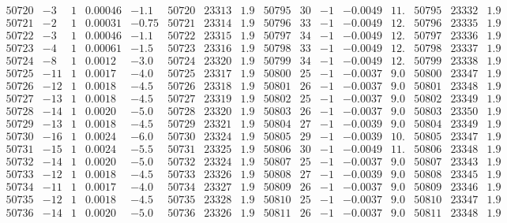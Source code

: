 \documentclass[11pt,reqno,a4letter]{article}
\numberwithin{figure}{section}
\numberwithin{table}{section}
\theoremstyle{plain}
\numberwithin{theorem}{section}
\theoremstyle{definition}
\begin{document}
\begin{table}[ht]
\begin{equation*}
{\begin{array}{ccccc|ccc||ccccc|ccc}
50720 & -3 & 1 & 0.00046 & -1.1 & 50720 & 23313 & 1.9 & 50795 & 30 & -1 & -0.0049 & 11. & 50795 & 23332 & 1.9  \\
50721 & -2 & 1 & 0.00031 & -0.75 & 50721 & 23314 & 1.9 & 50796 & 33 & -1 & -0.0049 & 12. & 50796 & 23335 & 1.9  \\
50722 & -3 & 1 & 0.00046 & -1.1 & 50722 & 23315 & 1.9 & 50797 & 34 & -1 & -0.0049 & 12. & 50797 & 23336 & 1.9  \\
50723 & -4 & 1 & 0.00061 & -1.5 & 50723 & 23316 & 1.9 & 50798 & 33 & -1 & -0.0049 & 12. & 50798 & 23337 & 1.9  \\
50724 & -8 & 1 & 0.0012 & -3.0 & 50724 & 23320 & 1.9 & 50799 & 34 & -1 & -0.0049 & 12. & 50799 & 23338 & 1.9  \\
50725 & -11 & 1 & 0.0017 & -4.0 & 50725 & 23317 & 1.9 & 50800 & 25 & -1 & -0.0037 & 9.0 & 50800 & 23347 & 1.9  \\
50726 & -12 & 1 & 0.0018 & -4.5 & 50726 & 23318 & 1.9 & 50801 & 26 & -1 & -0.0037 & 9.0 & 50801 & 23348 & 1.9  \\
50727 & -13 & 1 & 0.0018 & -4.5 & 50727 & 23319 & 1.9 & 50802 & 25 & -1 & -0.0037 & 9.0 & 50802 & 23349 & 1.9  \\
50728 & -14 & 1 & 0.0020 & -5.0 & 50728 & 23320 & 1.9 & 50803 & 26 & -1 & -0.0037 & 9.0 & 50803 & 23350 & 1.9  \\
50729 & -13 & 1 & 0.0018 & -4.5 & 50729 & 23321 & 1.9 & 50804 & 27 & -1 & -0.0039 & 9.0 & 50804 & 23349 & 1.9  \\
50730 & -16 & 1 & 0.0024 & -6.0 & 50730 & 23324 & 1.9 & 50805 & 29 & -1 & -0.0039 & 10. & 50805 & 23347 & 1.9  \\
50731 & -15 & 1 & 0.0024 & -5.5 & 50731 & 23325 & 1.9 & 50806 & 30 & -1 & -0.0049 & 11. & 50806 & 23348 & 1.9  \\
50732 & -14 & 1 & 0.0020 & -5.0 & 50732 & 23324 & 1.9 & 50807 & 25 & -1 & -0.0037 & 9.0 & 50807 & 23343 & 1.9  \\
50733 & -12 & 1 & 0.0018 & -4.5 & 50733 & 23326 & 1.9 & 50808 & 27 & -1 & -0.0039 & 9.0 & 50808 & 23345 & 1.9  \\
50734 & -11 & 1 & 0.0017 & -4.0 & 50734 & 23327 & 1.9 & 50809 & 26 & -1 & -0.0037 & 9.0 & 50809 & 23346 & 1.9  \\
50735 & -12 & 1 & 0.0018 & -4.5 & 50735 & 23328 & 1.9 & 50810 & 25 & -1 & -0.0037 & 9.0 & 50810 & 23347 & 1.9  \\
50736 & -14 & 1 & 0.0020 & -5.0 & 50736 & 23326 & 1.9 & 50811 & 26 & -1 & -0.0037 & 9.0 & 50811 & 23348 & 1.9  \\

\end{array}}
\end{equation*}
\end{table}
\end{document}

